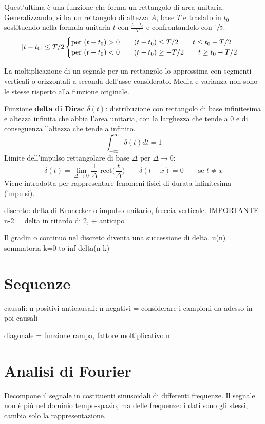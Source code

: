 Quest'ultima è una funzione che forma un rettangolo di area unitaria. Generalizzando, si ha un rettangolo di altezza $A$, base $T$ e traslato in $t_0$ sostituendo nella formula unitaria $t$ con $\frac{t - t_0}{T}$ e confrontandolo con $\nicefrac{1}{2}$.
$$\left|t - t_0\right| \leq T / 2 \begin{cases}
\text{per } (t - t_0) > 0 \qquad (t - t_0) \leq T / 2 \qquad t \leq t_0 + T / 2 \\
\text{per } (t - t_0) < 0 \qquad (t - t_0) \geq -T / 2 \qquad t \geq t_0 - T / 2
\end{cases}$$

La moltiplicazione di un segnale per un rettangolo lo approssima con segmenti verticali o orizzontali a seconda dell'asse considerato. Media e varianza non sono le stesse rispetto alla funzione originale.

Funzione \textbf{delta di Dirac} $\delta(t)$: distribuzione con rettangolo di base infinitesima e altezza infinita che abbia l'area unitaria, con la larghezza che tende a 0 e di conseguenza l'altezza che tende a infinito. 
$$\int_{-\infty}^{\infty} \delta(t) dt = 1$$
Limite dell'impulso rettangolare di base $\Delta$ per $\Delta \rightarrow 0$: 
$$\delta(t) = \lim\limits_{\Delta \rightarrow 0} \frac{1}{\Delta} \text{ rect}\Big(\frac{t}{\Delta}\Big) \qquad \delta(t - x) = 0 \qquad \text{se } t \neq x$$
Viene introdotta per rappresentare fenomeni fisici di durata infinitesima (impulsi).

discreto: delta di Kronecker o impulso unitario, freccia verticale. IMPORTANTE
n-2 = delta in ritardo di 2, + anticipo

Il gradin o continuo nel discreto diventa una successione di delta. 
u(n) = sommatoria k=0 to inf delta(n-k)

\section{Sequenze}
causali: n positivi
anticausali: n negativi
= considerare i campioni da adesso in poi causali

diagonale = funzione rampa, fattore moltiplicativo n

\section{Analisi di Fourier}
Decompone il segnale in costituenti sinusoidali di differenti frequenze. Il segnale non è più nel dominio tempo-spazio, ma delle frequenze: i dati sono gli stessi, cambia solo la rappresentazione.

 








